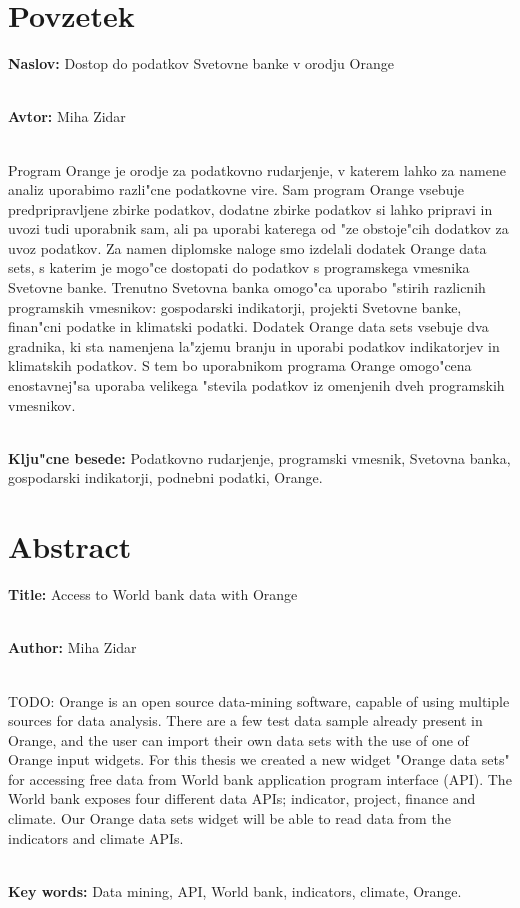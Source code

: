 \chapter*{Povzetek}


\textbf{Naslov:} Dostop do podatkov Svetovne banke v orodju Orange

\ \\
\textbf{Avtor:} Miha Zidar

\ \\
Program Orange je orodje za podatkovno rudarjenje, v katerem
lahko za namene analiz uporabimo razli"cne podatkovne vire. Sam program Orange
vsebuje predpripravljene zbirke podatkov, dodatne zbirke podatkov si lahko 
pripravi in uvozi tudi uporabnik sam, ali pa uporabi katerega od "ze obstoje"cih
dodatkov za uvoz podatkov. Za namen diplomske naloge smo izdelali dodatek 
Orange data sets, s katerim je mogo"ce dostopati do podatkov s programskega 
vmesnika Svetovne banke. Trenutno Svetovna banka omogo"ca uporabo "stirih 
razlicnih programskih vmesnikov: gospodarski indikatorji, projekti Svetovne banke, 
finan"cni podatke in klimatski podatki. Dodatek Orange data sets vsebuje dva
gradnika, ki sta namenjena la"zjemu branju in uporabi podatkov indikatorjev in 
klimatskih podatkov.
S tem bo uporabnikom programa Orange omogo"cena enostavnej"sa uporaba velikega "stevila
podatkov iz omenjenih dveh programskih vmesnikov.

\ \\
\textbf{Klju"cne besede:} Podatkovno rudarjenje, programski vmesnik, 
Svetovna banka, gospodarski indikatorji, podnebni podatki, Orange. 




\clearemptydoublepage

\chapter*{Abstract}


\textbf{Title:} Access to World bank data with Orange

\ \\
\textbf{Author:} Miha Zidar

\ \\
TODO: Orange is an open source data-mining software, capable of using multiple
sources for data analysis. There are a few test data sample already present
in Orange, and the user can import their own data sets with the use of one of
Orange input widgets. For this thesis we created a new widget "Orange data sets"
for accessing free data from World bank application program interface (API).
The World bank exposes four different data APIs; indicator, project, finance
and climate. Our Orange data sets widget will be able to read data from the
indicators and climate APIs.


\ \\
\textbf{Key words:} Data mining, API, World bank, indicators, climate, Orange.

